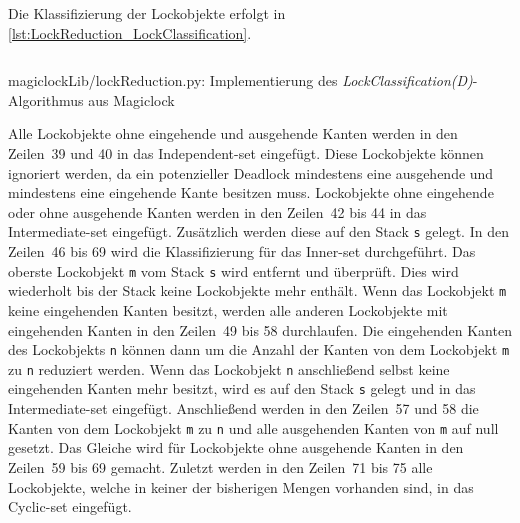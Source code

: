 Die Klassifizierung der Lockobjekte erfolgt in
\cref{lst:LockReduction_LockClassification}.
\begin{listing}[ht]
  \inputminted[frame=lines,linenos,firstline=35,lastline=77]{python}{./Python/magiclockLib/lockReduction.py}
  \caption{magiclockLib/lockReduction.py: Implementierung des \emph{LockClassification(D)}-Algorithmus aus Magiclock \autocite[5]{MagicLock}}
  \label{lst:LockReduction_LockClassification}
\end{listing}
Alle Lockobjekte ohne eingehende und ausgehende Kanten werden in den Zeilen~39
und 40 in das \textrm{Independent-set} eingefügt. Diese Lockobjekte können
ignoriert werden, da ein potenzieller Deadlock mindestens eine ausgehende und
mindestens eine eingehende Kante besitzen muss. Lockobjekte ohne eingehende oder
ohne ausgehende Kanten werden in den Zeilen~42 bis 44 in das
\textrm{Intermediate-set} eingefügt. Zusätzlich werden diese auf den Stack
\texttt{s} gelegt. In den Zeilen~46 bis 69 wird die Klassifizierung für das
\textrm{Inner-set} durchgeführt. Das oberste Lockobjekt \texttt{m} vom Stack \texttt{s}
wird entfernt und überprüft. Dies wird wiederholt bis der Stack keine
Lockobjekte mehr enthält. Wenn das Lockobjekt \texttt{m} keine eingehenden
Kanten besitzt, werden alle anderen Lockobjekte mit eingehenden Kanten in den
Zeilen~49 bis 58 durchlaufen. Die eingehenden Kanten des Lockobjekts \texttt{n}
können dann um die Anzahl der Kanten von dem Lockobjekt \texttt{m} zu \texttt{n}
reduziert werden. Wenn das Lockobjekt \texttt{n} anschließend selbst keine
eingehenden Kanten mehr besitzt, wird es auf den Stack \texttt{s} gelegt und in
das \textrm{Intermediate-set} eingefügt. Anschließend werden in den Zeilen~57
und 58 die Kanten von dem Lockobjekt \texttt{m} zu \texttt{n} und alle
ausgehenden Kanten von \texttt{m} auf null gesetzt. Das Gleiche wird für
Lockobjekte ohne ausgehende Kanten in den Zeilen~59 bis 69 gemacht. Zuletzt
werden in den Zeilen~71 bis 75 alle Lockobjekte, welche in keiner der bisherigen
Mengen vorhanden sind, in das \textrm{Cyclic-set} eingefügt.

